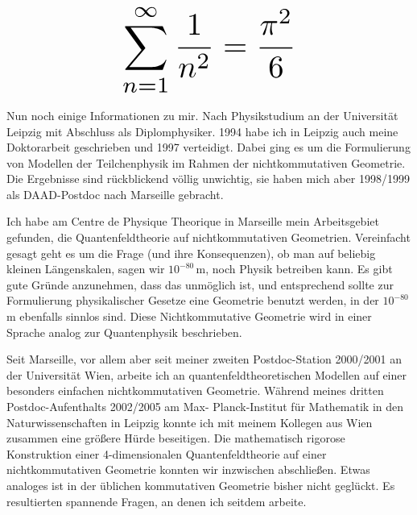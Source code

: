 \begin{multicols}{2}
\[
\resizebox{0.45\hsize}{!}{$\displaystyle\sum_{n = 1}^\infty \frac{1}{n^2} = \frac{\pi^2}{6}$}
\]

Nun noch einige Informationen zu mir. Nach Physikstudium an der Universität Leipzig mit Abschluss als Diplomphysiker. 1994 habe ich in Leipzig auch meine Doktorarbeit geschrieben und 1997 verteidigt. Dabei ging es um die Formulierung von Modellen der Teilchenphysik im Rahmen der nichtkommutativen Geometrie. Die Ergebnisse sind rückblickend völlig unwichtig, sie haben mich aber 1998/1999 als DAAD-Postdoc nach Marseille gebracht.

Ich habe am Centre de Physique Theorique in Marseille mein Arbeitsgebiet gefunden, die Quantenfeldtheorie auf nichtkommutativen Geometrien. Vereinfacht gesagt geht es um die Frage (und ihre Konsequenzen), ob man auf beliebig kleinen Längenskalen, sagen wir $10^{-80}$\,m, noch Physik betreiben kann. Es gibt gute Gründe anzunehmen, dass das unmöglich ist, und entsprechend sollte zur Formulierung physikalischer Gesetze eine Geometrie benutzt werden, in der $10^{-80}$\,m ebenfalls sinnlos sind. Diese Nichtkommutative Geometrie wird in einer Sprache analog zur Quantenphysik beschrieben.

Seit Marseille, vor allem aber seit meiner zweiten Postdoc-Station 2000/2001 an der Universität Wien, arbeite ich an quantenfeldtheoretischen Modellen auf einer besonders einfachen nichtkommutativen Geometrie. Während meines dritten Postdoc-Aufenthalts 2002/2005 am Max- Planck-Institut für Mathematik in den Naturwissenschaften in Leipzig konnte ich mit meinem Kollegen aus Wien zusammen eine größere Hürde beseitigen. Die mathematisch rigorose Konstruktion einer 4-dimensionalen Quantenfeldtheorie auf einer nichtkommutativen Geometrie konnten wir inzwischen abschließen. Etwas analoges ist in der üblichen kommutativen Geometrie bisher nicht geglückt. Es resultierten spannende Fragen, an denen ich seitdem arbeite.
\end{multicols}

\begin{center}
\end{center}
